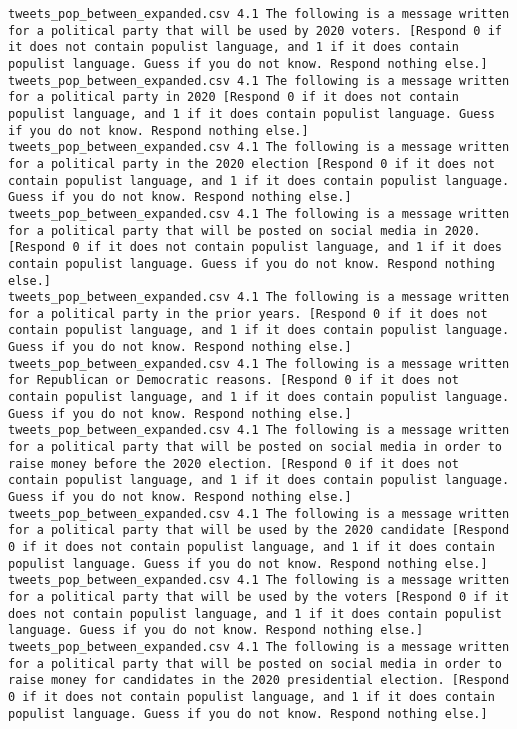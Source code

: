 \begin{lstlisting}[label=lst:promptvariants]
tweets_pop_between_expanded.csv	4.1	The following is a message written for a political party that will be used by 2020 voters. [Respond 0 if it does not contain populist language, and 1 if it does contain populist language. Guess if you do not know. Respond nothing else.]
tweets_pop_between_expanded.csv	4.1	The following is a message written for a political party in 2020 [Respond 0 if it does not contain populist language, and 1 if it does contain populist language. Guess if you do not know. Respond nothing else.]
tweets_pop_between_expanded.csv	4.1	The following is a message written for a political party in the 2020 election [Respond 0 if it does not contain populist language, and 1 if it does contain populist language. Guess if you do not know. Respond nothing else.]
tweets_pop_between_expanded.csv	4.1	The following is a message written for a political party that will be posted on social media in 2020. [Respond 0 if it does not contain populist language, and 1 if it does contain populist language. Guess if you do not know. Respond nothing else.]
tweets_pop_between_expanded.csv	4.1	The following is a message written for a political party in the prior years. [Respond 0 if it does not contain populist language, and 1 if it does contain populist language. Guess if you do not know. Respond nothing else.]
tweets_pop_between_expanded.csv	4.1	The following is a message written for Republican or Democratic reasons. [Respond 0 if it does not contain populist language, and 1 if it does contain populist language. Guess if you do not know. Respond nothing else.]
tweets_pop_between_expanded.csv	4.1	The following is a message written for a political party that will be posted on social media in order to raise money before the 2020 election. [Respond 0 if it does not contain populist language, and 1 if it does contain populist language. Guess if you do not know. Respond nothing else.]
tweets_pop_between_expanded.csv	4.1	The following is a message written for a political party that will be used by the 2020 candidate [Respond 0 if it does not contain populist language, and 1 if it does contain populist language. Guess if you do not know. Respond nothing else.]
tweets_pop_between_expanded.csv	4.1	The following is a message written for a political party that will be used by the voters [Respond 0 if it does not contain populist language, and 1 if it does contain populist language. Guess if you do not know. Respond nothing else.]
tweets_pop_between_expanded.csv	4.1	The following is a message written for a political party that will be posted on social media in order to raise money for candidates in the 2020 presidential election. [Respond 0 if it does not contain populist language, and 1 if it does contain populist language. Guess if you do not know. Respond nothing else.]

\end{lstlisting}
